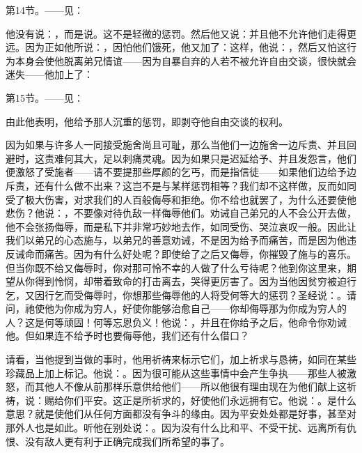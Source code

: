 第14节。——见：\par

他没有说：，而是说。这不是轻微的惩罚。然后他又说：并且他不允许他们走得更远。因为正如他所说：，因怕他们饿死，他又加了：这样，他说：，然后又怕这行为本身会使他脱离弟兄情谊——因为自暴自弃的人若不被允许自由交谈，很快就会迷失——他加上了：\par

第15节。——见：\par

由此他表明，他给予那人沉重的惩罚，即剥夺他自由交谈的权利。\par

因为如果与许多人一同接受施舍尚且可耻，那么当他们一边施舍一边斥责、并且回避时，这责难何其大，足以刺痛灵魂。因为如果只是迟延给予、并且发怨言，他们便激怒了受施者——请不要提那些厚颜的乞丐，而是指信徒——如果他们边给予边斥责，还有什么做不出来？这岂不是与某样惩罚相等？我们却不这样做，反而如同受了极大伤害，对求我们的人百般侮辱和拒绝。你不给也就罢了，为什么还要使他悲伤？他说：，不要像对待仇敌一样侮辱他们。劝诫自己弟兄的人不会公开去做，他不会张扬侮辱，而是私下并非常巧妙地去作，如同受伤、哭泣哀叹一般。因此让我们以弟兄的心态施与，以弟兄的善意劝诫，不是因为给予而痛苦，而是因为他违反诫命而痛苦。因为有什么好处呢？即使给了之后又侮辱，你摧毁了施与的喜乐。但当你既不给又侮辱时，你对那可怜不幸的人做了什么亏待呢？他到你这里来，期望从你得到怜悯，却带着致命的打击离去，哭得更厉害了。因为当他因贫穷被迫行乞，又因行乞而受侮辱时，你想那些侮辱他的人将受何等大的惩罚？圣经说：。请问，祂使他为你成为穷人，好使你能够治愈自己——你却侮辱那为你成为穷人的人？这是何等顽固！何等忘恩负义！他说：，并且在你给予之后，他命令你劝诫他。但如果连不给予时也要侮辱他，我们还有什么借口？\par

\par

请看，当他提到当做的事时，他用祈祷来标示它们，加上祈求与恳祷，如同在某些珍藏品上加上标记。他说：。因为很可能从这些事情中会产生争执——那些人被激怒，而其他人不像从前那样乐意供给他们——所以他很有理由现在为他们献上这祈祷，说：赐给你们平安。这正是所祈求的，好使他们永远拥有它。他说：。是什么意思？就是使他们从任何方面都没有争斗的缘由。因为平安处处都是好事，甚至对那外人也是如此。听他在别处说：。因为没有什么比和平、不受干扰、远离所有仇恨、没有敌人更有利于正确完成我们所希望的事了。\par

